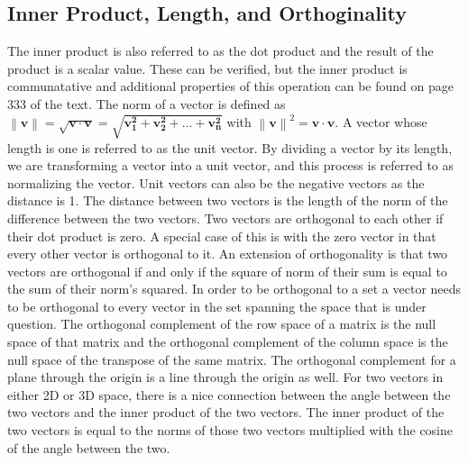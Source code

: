 \documentclass[12pt]{article}
\newcommand\norm[1]{\left\lVert#1\right\rVert}
\begin{document}
\subsection{Inner Product, Length, and Orthoginality}
The inner product is also referred to as the dot product and the result of the product is a scalar value. These can be verified, but the inner product is communatative and additional 
properties of this operation can be found on page 333 of the text. The norm of a vector is defined as $\norm{\mathbf{v}}=\sqrt{\mathbf{v}\cdot \mathbf{v}}=\sqrt{\mathbf{v_1^2}
+\mathbf{v_2^2}+\dots+\mathbf{v_n^2}}$ with $\norm{\mathbf{v}}^2=\mathbf{v\cdot v}$. A vector whose length is one is referred to as the unit vector. By dividing a vector by its 
length, we are transforming a vector into a unit vector, and this process is referred to as normalizing the vector. Unit vectors can also be the negative vectors as the distance is 1. 
The distance between two vectors is the length of the norm of the difference between the two vectors. Two vectors are orthogonal to each other if their dot product is zero. A special 
case of this is with the zero vector in that every other vector is orthogonal to it. An extension of orthogonality is that two vectors are orthogonal if and only if the square of 
norm of their sum is equal to the sum of their norm's squared. In order to be orthogonal to a set a vector needs to be orthogonal to every vector in the set spanning the space that is 
under question. The orthogonal complement of the row space of a matrix is the null space of that matrix and the orthogonal complement of the column space is the null space of the 
transpose of the same matrix. The orthogonal complement for a plane through the origin is a line through the origin as well. For two vectors in either 2D or 3D space, there is a nice 
connection between the angle between the two vectors and the inner product of the two vectors. The inner product of the two vectors is equal to the norms of those two vectors multiplied 
with the cosine of the angle between the two. 
\end{document}
